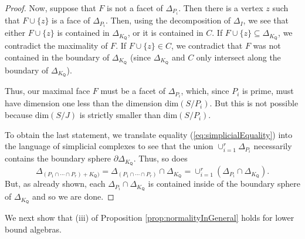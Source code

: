 \documentclass[ALCO,published]{cedram}
\numberwithin{equation}{section}
\newcommand{\1}{^{-1}}
\def\Q{\mathsf{Q}}
\begin{document}
\begin{proof}



Now, suppose that $F$ is not a facet of $\Delta_{P_i}$. Then there is a vertex $z$ such that $F\cup\{z\}$ is a face of $\Delta_{P_i}$.
Then, using the decomposition of $\Delta_I$, we see that either $F\cup\{z\}$ is contained in $\Delta_{K_\Q}$, or it is contained in $C$. If $F\cup \{z\}\subseteq \Delta_{K_\Q}$, we contradict the maximality of $F$. If $F\cup\{z\}\in C$, we contradict that $F$ was not contained in the boundary of $\Delta_{K_\Q}$ (since $\Delta_{K_\Q}$ and $C$ only intersect along the boundary of $\Delta_{K_\Q}$).

Thus, our maximal face $F$ must be a facet of $\Delta_{P_i}$, which, since $P_i$ is prime, must have dimension one less than the dimension $\mathrm{dim}(S/P_i)$. But this is not possible because $\mathrm{dim}(S/J)$ is strictly smaller than $\mathrm{dim}(S/P_i)$.

To obtain the last statement, we translate equality (\ref{eq:simplicialEquality}) into the language of simplicial complexes to see that the union $\cup_{i=1}^r \Delta_{P_i}$ necessarily contains the boundary sphere $\partial \Delta_{K_\Q}$. Thus, so does 
\[\Delta_{(P_1\cap\cdots \cap P_r)+K_\Q)} = \Delta_{(P_1\cap\cdots\cap P_r)}\cap \Delta_{K_\Q} = \cup_{i=1}^r (\Delta_{P_i}\cap \Delta_{K_\Q}). \]
But, as already shown, each $\Delta_{P_i}\cap \Delta_{K_\Q}$ is contained inside of the boundary sphere of $\Delta_{K_\Q}$ and so we are done.
\end{proof}

We next show that (iii) of Proposition \ref{prop:normalityInGeneral} holds for lower bound algebras.
\end{document}

